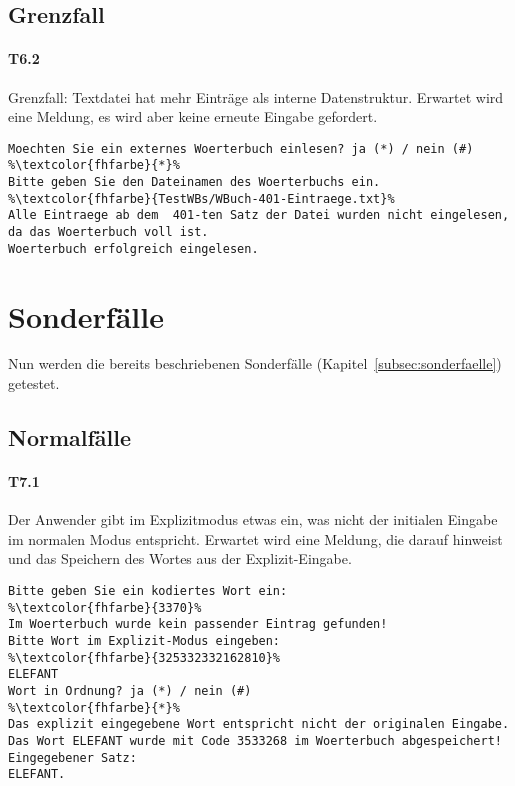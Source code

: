 \begin{center}
    \label{fig:wbuch4}
\end{center}
\subsection*{Grenzfall}\label{subsec:wbuch-grenzfaelle}
\paragraph*{T6.2} Grenzfall: Textdatei hat mehr Einträge als interne Datenstruktur.
Erwartet wird eine Meldung, es wird aber keine erneute Eingabe gefordert.
\begin{lstlisting}[escapechar=\%]
Moechten Sie ein externes Woerterbuch einlesen? ja (*) / nein (#)
%\textcolor{fhfarbe}{*}%
Bitte geben Sie den Dateinamen des Woerterbuchs ein.
%\textcolor{fhfarbe}{TestWBs/WBuch-401-Eintraege.txt}%
Alle Eintraege ab dem  401-ten Satz der Datei wurden nicht eingelesen, da das Woerterbuch voll ist.
Woerterbuch erfolgreich eingelesen.
\end{lstlisting}

\section{Sonderfälle}\label{sec:sonderfall-tests}
Nun werden die bereits beschriebenen Sonderfälle (Kapitel~\ref{subsec:sonderfaelle}) getestet.

\subsection*{Normalfälle}\label{subsec:sonder-normalfaelle}
\paragraph*{T7.1} Der Anwender gibt im Explizitmodus etwas ein, was nicht der initialen Eingabe im normalen Modus entspricht.
Erwartet wird eine Meldung, die darauf hinweist und das Speichern des Wortes aus der Explizit-Eingabe.
\begin{lstlisting}[escapechar=\%]
Bitte geben Sie ein kodiertes Wort ein:
%\textcolor{fhfarbe}{3370}%
Im Woerterbuch wurde kein passender Eintrag gefunden!
Bitte Wort im Explizit-Modus eingeben:
%\textcolor{fhfarbe}{325332332162810}%
ELEFANT
Wort in Ordnung? ja (*) / nein (#)
%\textcolor{fhfarbe}{*}%
Das explizit eingegebene Wort entspricht nicht der originalen Eingabe.
Das Wort ELEFANT wurde mit Code 3533268 im Woerterbuch abgespeichert!
Eingegebener Satz:
ELEFANT.
\end{lstlisting}

